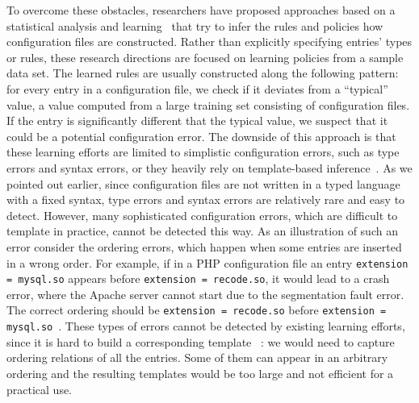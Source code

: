 To overcome these obstacles, researchers have proposed approaches based on
a statistical analysis and learning~\cite{wang04automatic, zhang14encore, yuan11context}
that try to infer the rules and policies how configuration files are constructed.
Rather than explicitly specifying entries' types or rules, these research directions are focused
on learning policies from a sample data set.
The learned rules are usually constructed along the following pattern: for every entry in a configuration file, 
we check if it deviates from a ``typical'' value, \ie a value computed from a large training set consisting of configuration files.
If the entry is significantly different that the typical value, we suspect that it could be a potential configuration error.
The downside of this approach is that these learning efforts are limited to simplistic 
configuration errors, such as type errors and syntax errors, or they 
heavily rely on template-based inference~\cite{zhang14encore}. As we pointed out earlier, since configuration files are not written in a typed language with a fixed syntax,
type errors and syntax errors are relatively rare and easy to detect. However, many sophisticated configuration errors, 
which are difficult to template in practice, cannot be detected this way. As an illustration of such an error consider the ordering errors, which
happen when some entries are inserted in a wrong order. 
For example, if in a PHP configuration file an entry {\tt extension = mysql.so} appears 
before {\tt extension = recode.so},  
it would lead to a crash error, where the Apache server cannot start due to the segmentation fault error. The correct ordering 
should be {\tt extension = recode.so} before 
{\tt extension = mysql.so}~\cite{yin11anempirical}.
These types of errors cannot be detected by existing
learning efforts, since it is hard to build a corresponding template ~\cite{xu15systems}: we would need to capture ordering relations of all the entries. Some of 
them can appear in an arbitrary ordering and the resulting templates would be too large and not efficient for a practical use.



